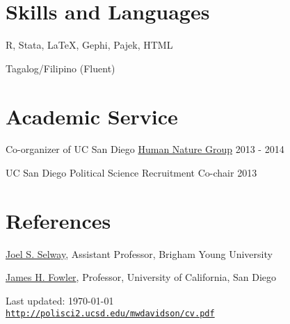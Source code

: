 \documentclass[letterpaper]{article}
\def\footerlink{http://polisci2.ucsd.edu/mwdavidson/cv.pdf}
\renewenvironment{itemize}{
  \begin{list}{}{
    \setlength{\leftmargin}{1.5em}
  }
}{
  \end{list}
}
\begin{document}
\section*{Skills and Languages}
\begin{itemize}
\item R, Stata, LaTeX, Gephi, Pajek, HTML
\item Tagalog/Filipino (Fluent)
\end{itemize}

\section*{Academic Service}
\begin{itemize}
  \item Co-organizer of UC San Diego \href{http://hng.ucsd.edu/index.html}{Human Nature Group} \hfill 2013 - 2014
  \item UC San Diego Political Science Recruitment Co-chair \hfill 2013
\end{itemize}


\section*{References}
\begin{itemize}
\item \href{https://sites.google.com/site/joelsawatselway/}{Joel S. Selway}, Assistant Professor, Brigham Young University
\item \href{jhfowler.ucsd.edu}{James H. Fowler}, Professor, University of California, San Diego
\end{itemize}

\bigskip
\begin{center}
  \begin{footnotesize}
    Last updated: \today \\
    \href{\footerlink}{\texttt{\footerlink}}
  \end{footnotesize}
\end{center}
\end{document}

